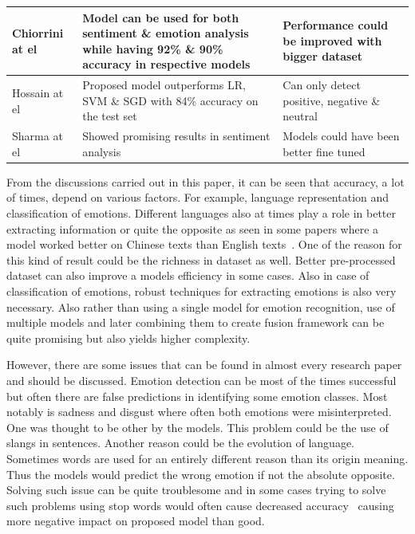 \documentclass[runningheads]{llncs}
\begin{document}
\begin{table}
{\begin{tabular}{|l|p{5cm}|p{5cm}|}
\hline
Chiorrini at el~\cite{ref24} & Model can be used for both sentiment \& emotion analysis while having 92\% \& 90\% accuracy in respective models  & Performance could be improved with bigger dataset\\
\hline
Hossain at el~\cite{ref4} & Proposed model outperforms LR, SVM \& SGD with 84\% accuracy on the test set  & Can only detect positive, negative \& neutral\\
\hline
Sharma at el~\cite{ref34} & Showed promising results in sentiment analysis & Models could have been better fine tuned\\
\hline
\end{tabular}
}
\end{table}

From the discussions carried out in this paper, it can be seen that accuracy, a lot of times, depend on various factors. For example, language representation and classification of emotions. Different languages also at times play a role in better extracting information or quite the opposite as seen in some papers where a model worked better on Chinese texts than English texts~\cite{ref23}. One of the reason for this kind of result could be the richness in dataset as well. Better pre-processed dataset can also improve a models efficiency in some cases. Also in case of classification of emotions, robust techniques for extracting emotions is also very necessary. Also rather than using a single model for emotion recognition, use of multiple models and later combining them to create fusion framework can be quite promising but also yields higher complexity. 

However, there are some issues that can be found in almost every research paper and should be discussed. Emotion detection can be most of the times successful but often there are false predictions in identifying some emotion classes. Most notably is sadness and disgust where often both emotions were misinterpreted. One was thought to be other by the models. This problem could be the use of slangs in sentences. Another reason could be the evolution of language. Sometimes words are used for an entirely different reason than its origin meaning. Thus the models would predict the wrong emotion if not the absolute opposite. Solving such issue can be quite troublesome and in some cases trying to solve such problems using stop words would often cause decreased accuracy~\cite{ref29} causing more negative impact on proposed model than good.
\end{document}

